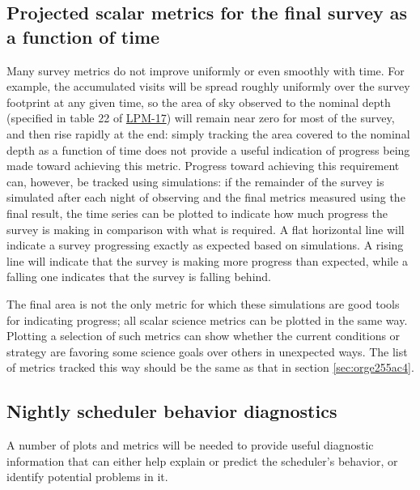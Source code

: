 \subsection{Projected scalar metrics for the final survey as a function of time}
\label{sec:org80a0180}
Many survey metrics do not improve uniformly or even smoothly with time.
For example, the accumulated visits will be spread roughly uniformly over the survey footprint at any given time, so the area of sky observed to the nominal depth (specified in table 22 of \href{http://ls.st/lpm-17}{LPM-17}) will remain near zero for most of the survey, and then rise rapidly at the end: simply tracking the area covered to the nominal depth as a function of time does not provide a useful indication of progress being made toward achieving this metric.
Progress toward achieving this requirement can, however, be tracked using simulations: if the remainder of the survey is simulated after each night of observing and the final metrics measured using the final result, the time series can be plotted to indicate how much progress the survey is making in comparison with what is required.
A flat horizontal line will indicate a survey progressing exactly as expected based on simulations.
A rising line will indicate that the survey is making more progress than expected, while a falling one indicates that the survey is falling behind.

The final area is not the only metric for which these simulations are good tools for indicating progress; all scalar science metrics can be plotted in the same way. Plotting a selection of such metrics can show whether the current conditions or strategy are favoring some science goals over others in unexpected ways.
The list of metrics tracked this way should be the same as that in section \ref{sec:orge255ac4}.

\subsection{Nightly scheduler behavior diagnostics}
\label{sec:org444a433}
A number of plots and metrics will be needed to provide useful diagnostic information that can either help explain or predict the scheduler's behavior, or identify potential problems in it.

